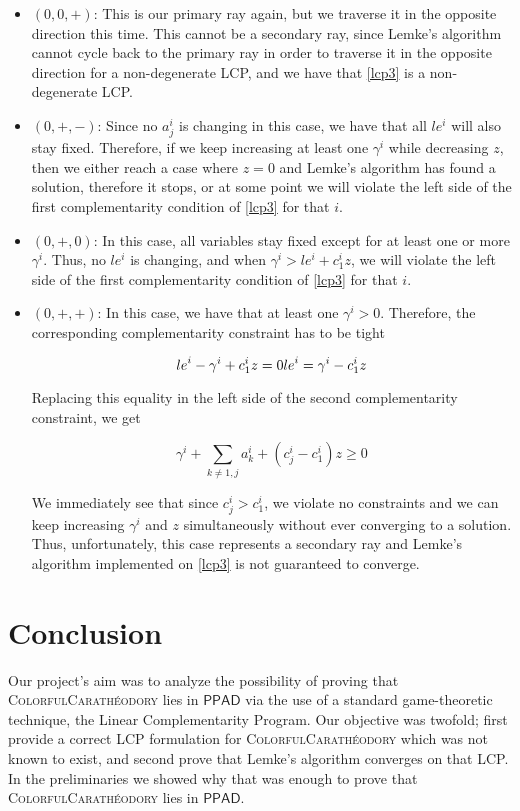 \documentclass[a4paper,11pt]{article}
\def\cc#1{\mathsf{#1}}
\def\PPAD{\ensuremath{\cc{PPAD}}\xspace}
\def\problem#1{\textsc{#1}}
\def\CCP{\problem{ColorfulCarath\'eodory}\xspace}
\begin{document}
\begin{itemize}
\item $(0, 0, +)$: This is our primary ray again, but we traverse it in the opposite direction this time. This cannot be a
secondary ray, since Lemke's algorithm cannot cycle back to the primary ray in order to traverse it in the opposite
direction for a non-degenerate LCP, and we have that \eqref{lcp3} is a non-degenerate LCP.

\item $(0, +, -)$: Since no $a^i_j$ is changing in this case, we have that all $le^i$ will also stay fixed. Therefore,
if we keep increasing at least one $\gamma^i$ while decreasing $z$, then we either reach a case where $z = 0$ and Lemke's
algorithm has found a solution, therefore it stops, or at some point we will violate the left side of the first
complementarity condition of \eqref{lcp3} for that $i$.

\item $(0, +, 0)$: In this case, all variables stay fixed except for at least one or more $\gamma^i$. Thus, no $le^i$ is
changing, and when $\gamma^i > le^i + c^i_1 z$, we will violate the left side of the first complementarity
condition of \eqref{lcp3} for that $i$.

\item $(0, +, +)$: In this case, we have that at least one $\gamma^i > 0$. Therefore, the corresponding complementarity
constraint has to be tight

\[
{le}^i - \gamma^i + c^i_1 z = 0 \\
{le}^i = \gamma^i - c^i_1 z
\]

\par Replacing this equality in the left side of the second complementarity constraint, we get

\[
\gamma^i + \sum_{k \neq 1, j} {a^i_k} + (c^i_j - c^i_1) z \geq 0
\]

\par We immediately see that since $c^i_j > c^i_1$, we violate no constraints and we can keep increasing $\gamma^i$ and
$z$ simultaneously without ever converging to a solution. Thus, unfortunately, this case represents a secondary ray and
Lemke's algorithm implemented on \eqref{lcp3} is not guaranteed to converge.
\end{itemize}

\section{Conclusion}

\par Our project's aim was to analyze the possibility of proving that \CCP lies in \PPAD via the use of a standard
game-theoretic technique, the Linear Complementarity Program. Our objective was twofold; first provide a correct LCP
formulation for \CCP which was not known to exist, and second prove that Lemke's algorithm converges on that LCP. In
the preliminaries we showed why that was enough to prove that \CCP lies in \PPAD.
\end{document}

